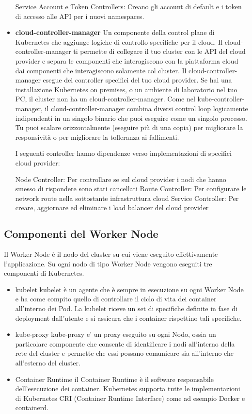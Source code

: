 \begin{itemize}
    Service Account e Token Controllers: Creano gli account di default e i token di accesso alle API per i nuovi namespaces.
    \item\textbf{cloud-controller-manager}
    Un componente della control plane di Kubernetes che aggiunge logiche di controllo specifiche per il cloud. Il cloud-controller-manager ti permette di collegare il tuo cluster con le API del cloud provider e separa le componenti che interagiscono con la piattaforma cloud dai componenti che interagiscono solamente col cluster.
    Il cloud-controller-manager esegue dei controller specifici del tuo cloud provider. Se hai una installazione Kubernetes on premises, o un ambiente di laboratorio nel tuo PC, il cluster non ha un cloud-controller-manager.
    Come nel kube-controller-manager, il cloud-controller-manager combina diversi control loop logicamente indipendenti in un singolo binario che puoi eseguire come un singolo processo. Tu puoi scalare orizzontalmente (eseguire più di una copia) per migliorare la responsività o per migliorare la tolleranza ai fallimenti.
    
    I seguenti controller hanno dipendenze verso implementazioni di specifici cloud provider:

    Node Controller: Per controllare se sul cloud provider i nodi che hanno smesso di rispondere sono stati cancellati
    Route Controller: Per configurare le network route nella sottostante infrastruttura cloud
    Service Controller: Per creare, aggiornare ed eliminare i load balancer del cloud provider

\end{itemize}
\subsection{Componenti del Worker Node}
Il Worker Node è il nodo del cluster su cui viene eseguito effettivamente l'applicazione. Su ogni nodo di tipo Worker Node vengono eseguiti tre componenti di Kubernetes.
\begin{itemize}
    \item{kubelet}
     kubelet è un agente che è sempre in esecuzione su ogni Worker Node e ha come compito quello di controllare il ciclo di vita dei container all'interno dei Pod. La kubelet riceve un set di specifiche definite in fase di deployment dall'utente  e si assicura che i container rispettino tali specifiche.
    \item{kube-proxy}
    kube-proxy e' un proxy eseguito su ogni Nodo, ossia un particolare componente che consente di identificare i nodi all'interno della rete del cluster e permette che essi possano comunicare sia all'interno che all'esterno del cluster.
    \item{Container Runtime} il Container Runtime è il software responsabile dell'esecuzione dei container. Kubernetes supporta tutte le implementazioni di Kubernetes CRI (Container Runtime Interface) come ad esempio Docker e containerd.
\end{itemize}
